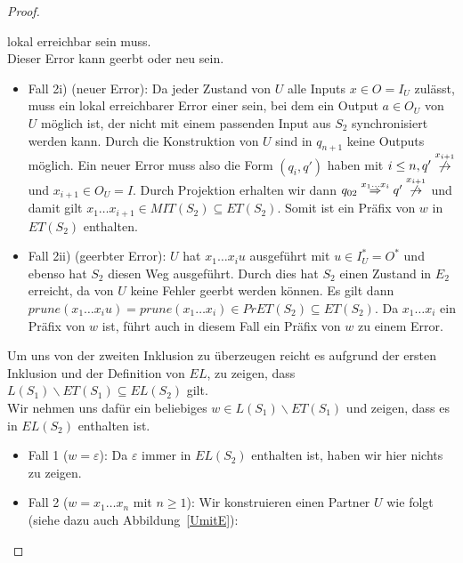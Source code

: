 \begin{proof}
\begin{itemize}
      lokal erreichbar sein muss.\\
      Dieser Error kann geerbt oder neu sein.
      \begin{itemize}
        \item Fall 2i) (neuer Error): Da jeder Zustand von $U$ alle Inputs $x\in
          O=I_U$ zulässt, muss ein lokal erreichbarer Error einer sein, bei dem
          ein Output $a\in O_U$ von $U$ möglich ist, der nicht mit einem
          passenden Input aus $S_2$ synchronisiert werden kann. Durch die
          Konstruktion von $U$ sind in $q_{n+1}$ keine Outputs möglich. Ein
          neuer Error muss also die Form $(q_i,q')$ haben mit $i\leq n, q'
          \overset{x_{i+1}}{\not{\hspace{-0.1cm}\rightarrow}}$ und $x_{i+1}\in
          O_U=I$. Durch Projektion erhalten wir dann $q_{02} \overset{x_1\dots
          x_i}{\Rightarrow} q'
          \overset{x_{i+1}}{\not{\hspace{-0.1cm}\rightarrow}}$ und damit gilt
          $x_1\dots x_{i+1}\in MIT(S_2)\subseteq ET(S_2)$. Somit ist ein Präfix
          von $w$ in $ET(S_2)$ enthalten.
        \item Fall 2ii) (geerbter Error): $U$ hat $x_1\dots x_i u$ ausgeführt
          mit $u\in I_U^*=O^*$ und ebenso hat $S_2$ diesen Weg ausgeführt.
          Durch dies hat $S_2$ einen Zustand in $E_2$ erreicht, da von $U$
          keine Fehler geerbt werden können. Es gilt dann $prune(x_1\dots
          x_iu)=prune(x_1\dots x_i)\in PrET(S_2)\subseteq ET(S_2)$. Da $x_1\dots
          x_i$ ein Präfix von $w$ ist, führt auch in diesem Fall ein Präfix von
          $w$ zu einem Error.
      \end{itemize}
  \end{itemize}
  Um uns von der zweiten Inklusion zu überzeugen reicht es aufgrund der ersten
  Inklusion und der Definition von $EL$, zu zeigen, dass
  $L(S_1)\backslash ET(S_1)\subseteq EL(S_2)$ gilt.\\
  Wir nehmen uns dafür ein beliebiges $w\in L(S_1)\backslash ET(S_1)$ und
  zeigen, dass es in $EL(S_2)$ enthalten ist.
  \begin{itemize}
    \item Fall 1 ($w=\varepsilon$): Da $\varepsilon$ immer in $EL(S_2)$
      enthalten ist, haben wir hier nichts zu zeigen.
    \item Fall 2 ($w=x_1\dots x_n$ mit $n\geq 1$): Wir konstruieren einen
      Partner $U$ wie folgt (siehe dazu auch Abbildung~\ref{UmitE}):
      \begin{itemize}

\end{itemize}
\end{itemize}
\end{proof}

